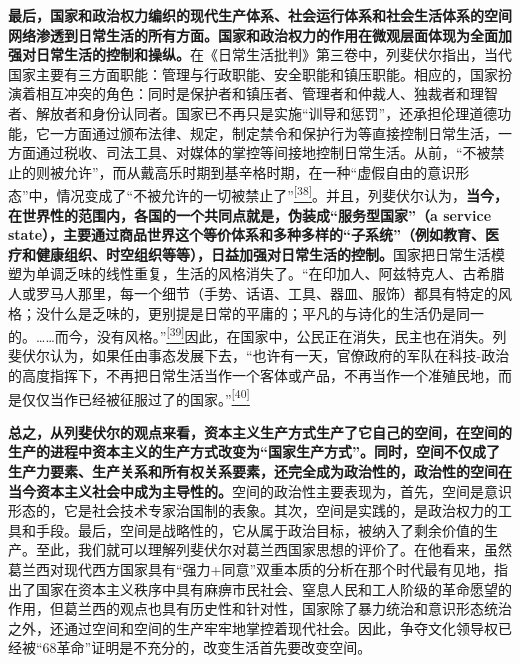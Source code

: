 \documentclass[UTF8, fontset = sourcesans, a4paper, oneside, zihao =
-4, scheme=chinese, no-math, space=true]{ctexbook}
\begin{document}
\textbf{最后，国家和政治权力编织的现代生产体系、社会运行体系和社会生活体系的空间网络渗透到日常生活的所有方面。国家和政治权力的作用在微观层面体现为全面加强对日常生活的控制和操纵。}在《日常生活批判》第三卷中，列斐伏尔指出，当代国家主要有三方面职能：管理与行政职能、安全职能和镇压职能。相应的，国家扮演着相互冲突的角色：同时是保护者和镇压者、管理者和仲裁人、独裁者和理智者、解放者和身份认同者。国家已不再只是实施``训导和惩罚''，还承担伦理道德功能，它一方面通过颁布法律、规定，制定禁令和保护行为等直接控制日常生活，一方面通过税收、司法工具、对媒体的掌控等间接地控制日常生活。从前，``不被禁止的则被允许''，而从戴高乐时期到基辛格时期，在一种``虚假自由的意识形态''中，情况变成了``不被允许的一切被禁止了''\protect\hypertarget{part0007_split_002.htmlux5cux23w38}{}{}\protect\hyperlink{part0007_split_004.htmlux5cux23m38}{\textsuperscript{{[}38{]}}}。并且，列斐伏尔认为，\textbf{当今，在世界性的范围内，各国的一个共同点就是，伪装成``服务型国家''（a
service
state），主要通过商品世界这个等价体系和多种多样的``子系统''（例如教育、医疗和健康组织、时空组织等等），日益加强对日常生活的控制。}国家把日常生活模塑为单调乏味的线性重复，生活的风格消失了。``在印加人、阿兹特克人、古希腊人或罗马人那里，每一个细节（手势、话语、工具、器皿、服饰）都具有特定的风格；没什么是乏味的，更别提是日常的平庸的；平凡的与诗化的生活仍是同一的。……而今，没有风格。''\protect\hypertarget{part0007_split_002.htmlux5cux23w39}{}{}\protect\hyperlink{part0007_split_004.htmlux5cux23m39}{\textsuperscript{{[}39{]}}}因此，在国家中，公民正在消失，民主也在消失。列斐伏尔认为，如果任由事态发展下去，``也许有一天，官僚政府的军队在科技-政治的高度指挥下，不再把日常生活当作一个客体或产品，不再当作一个准殖民地，而是仅仅当作已经被征服过了的国家。''\protect\hypertarget{part0007_split_002.htmlux5cux23w40}{}{}\protect\hyperlink{part0007_split_004.htmlux5cux23m40}{\textsuperscript{{[}40{]}}}

\textbf{总之，从列斐伏尔的观点来看，资本主义生产方式生产了它自己的空间，在空间的生产的进程中资本主义的生产方式改变为``国家生产方式''。同时，空间不仅成了生产力要素、生产关系和所有权关系要素，还完全成为政治性的，政治性的空间在当今资本主义社会中成为主导性的。}空间的政治性主要表现为，首先，空间是意识形态的，它是社会技术专家治国制的表象。其次，空间是实践的，是政治权力的工具和手段。最后，空间是战略性的，它从属于政治目标，被纳入了剩余价值的生产。至此，我们就可以理解列斐伏尔对葛兰西国家思想的评价了。在他看来，虽然葛兰西对现代西方国家具有``强力+同意''双重本质的分析在那个时代最有见地，指出了国家在资本主义秩序中具有麻痹市民社会、窒息人民和工人阶级的革命愿望的作用，但葛兰西的观点也具有历史性和针对性，国家除了暴力统治和意识形态统治之外，还通过空间和空间的生产牢牢地掌控着现代社会。因此，争夺文化领导权已经被``68革命''证明是不充分的，改变生活首先要改变空间。
\end{document}
